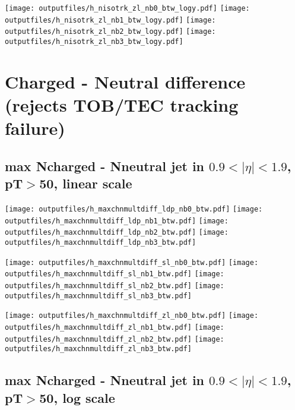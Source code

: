 \documentclass[11pt]{article}
\begin{document}
    \noindent
     \texttt{[image: outputfiles/h\_nisotrk\_zl\_nb0\_btw\_logy.pdf]}
     \texttt{[image: outputfiles/h\_nisotrk\_zl\_nb1\_btw\_logy.pdf]}
     \texttt{[image: outputfiles/h\_nisotrk\_zl\_nb2\_btw\_logy.pdf]}
     \texttt{[image: outputfiles/h\_nisotrk\_zl\_nb3\_btw\_logy.pdf]}


    \clearpage


 \section{ Charged - Neutral difference (rejects TOB/TEC tracking failure)}

    \subsection{ max Ncharged - Nneutral jet in  $0.9 < |\eta|< 1.9$, pT$>$50, linear scale}

    \noindent
     \texttt{[image: outputfiles/h\_maxchnmultdiff\_ldp\_nb0\_btw.pdf]}
     \texttt{[image: outputfiles/h\_maxchnmultdiff\_ldp\_nb1\_btw.pdf]}
     \texttt{[image: outputfiles/h\_maxchnmultdiff\_ldp\_nb2\_btw.pdf]}
     \texttt{[image: outputfiles/h\_maxchnmultdiff\_ldp\_nb3\_btw.pdf]}

    \noindent
     \texttt{[image: outputfiles/h\_maxchnmultdiff\_sl\_nb0\_btw.pdf]}
     \texttt{[image: outputfiles/h\_maxchnmultdiff\_sl\_nb1\_btw.pdf]}
     \texttt{[image: outputfiles/h\_maxchnmultdiff\_sl\_nb2\_btw.pdf]}
     \texttt{[image: outputfiles/h\_maxchnmultdiff\_sl\_nb3\_btw.pdf]}

    \noindent
     \texttt{[image: outputfiles/h\_maxchnmultdiff\_zl\_nb0\_btw.pdf]}
     \texttt{[image: outputfiles/h\_maxchnmultdiff\_zl\_nb1\_btw.pdf]}
     \texttt{[image: outputfiles/h\_maxchnmultdiff\_zl\_nb2\_btw.pdf]}
     \texttt{[image: outputfiles/h\_maxchnmultdiff\_zl\_nb3\_btw.pdf]}

    \clearpage


    \subsection{ max Ncharged - Nneutral jet in $0.9 < |\eta|< 1.9$, pT$>$50, log scale}
\end{document}
